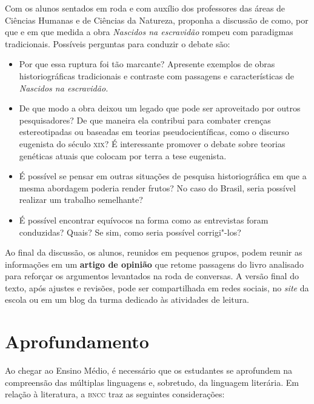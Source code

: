 \documentclass[12pt]{extarticle}
\begin{document}
Com os alunos sentados em roda e com auxílio dos professores das áreas
de Ciências Humanas e de Ciências da Natureza, proponha a discussão de
como, por que e em que medida a obra \emph{Nascidos na escravidão}
rompeu com paradigmas tradicionais. Possíveis perguntas para conduzir o
debate são:

\begin{itemize}
\item
  Por que essa ruptura foi tão marcante? Apresente exemplos de obras
  historiográficas tradicionais e contraste com passagens e
  características de \emph{Nascidos na escravidão.}
\item
  De que modo a obra deixou um legado que pode ser aproveitado por
  outros pesquisadores? De que maneira ela contribui para combater
  crenças estereotipadas ou baseadas em teorias pseudocientíficas, como
  o discurso eugenista do século \textsc{xix}? É interessante promover o debate
  sobre teorias genéticas atuais que colocam por terra a tese eugenista.
\item
  É possível se pensar em outras situações de pesquisa historiográfica
  em que a mesma abordagem poderia render frutos? No caso do Brasil,
  seria possível realizar um trabalho semelhante?
\item
  É possível encontrar equívocos na forma como as entrevistas foram
  conduzidas? Quais? Se sim, como seria possível corrigi"-los?
\end{itemize}

Ao final da discussão, os alunos, reunidos em pequenos grupos, podem
reunir as informações em um \textbf{artigo de opinião} que retome
passagens do livro analisado para reforçar os argumentos levantados na
roda de conversas. A versão final do texto, após ajustes e revisões,
pode ser compartilhada em redes sociais, no \emph{site} da escola ou em
um blog da turma dedicado às atividades de leitura.

\section{Aprofundamento}

Ao chegar ao Ensino Médio, é necessário que os estudantes se aprofundem
na compreensão das múltiplas linguagens e, sobretudo, da linguagem
literária. Em relação à literatura, a \textsc{bncc} traz as seguintes
considerações:
\end{document}
